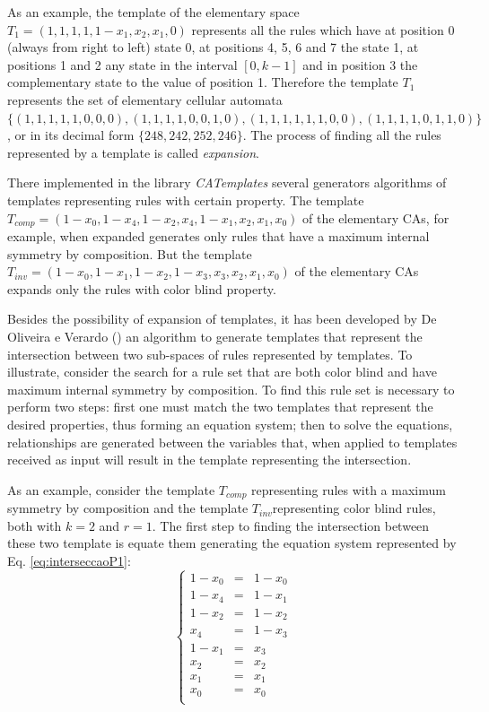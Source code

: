\documentclass[12pt, a4paper]{article}
\begin{document}
As an example, the template of the elementary space $T_1 = (1,1,1,1,1-x_1,x_2,x_1,0)$ represents all the rules which have at position 0 (always from right to left) state 0, at positions 4, 5, 6 and 7 the state 1, at positions 1 and 2 any state in the interval $ [0, k-1] $ and in position 3 the complementary state to the value of position 1. Therefore the template $T_1$ represents the set of elementary cellular automata $\{(1,1,1,1,1,0,0,0),(1,1,1,1,0,0,1,0),(1,1,1,1,1,1,0,0),(1,1,1,1,0,1,1,0)\}$, or in its decimal form $\{248,242,252,246\}$. The process of finding all the rules represented by a template is called \textit{expansion}.

There implemented in the library \textit{CATemplates} \cite{CATemplates} several generators algorithms of templates representing rules with certain property. The template $T_{comp} = (1 - x_0, 1 - x_4, 1 - x_2, x_4, 1 - x_1, x_2, x_1, x_0)$ of the elementary CAs, for example, when expanded generates only rules that have a maximum internal symmetry by composition. But the template $T_{inv} = (1 - x_0, 1 - x_1, 1 - x_2, 1 - x_3, x_3, x_2, x_1, x_0)$ of the elementary CAs expands only the rules with color blind property.

Besides the possibility of expansion of templates, it has been developed by De Oliveira e Verardo (\citeyear{deOliveira2014b}) an algorithm to generate templates that represent the intersection between two sub-spaces of rules represented by templates. To illustrate, consider the search for a rule set that are both color blind and have maximum internal symmetry by composition. To find this rule set is necessary to perform two steps: first one must match the two templates that represent the desired properties, thus forming an equation system; then to solve the equations, relationships are generated between the variables that, when applied to templates received as input will result in the template representing the intersection.

As an example, consider the template $T_{comp}$ representing rules with a maximum symmetry by composition and the template $T_{inv}$representing color blind rules, both with $k=2$ and $r=1$. The first step to finding the intersection between these two template is equate them generating the equation system represented by Eq. \ref{eq:interseccaoP1}:
\begin{equation}
\left\{\begin{matrix}
1 - x_0	& = & 1 - x_0	\\
1 - x_4	& = & 1 - x_1	\\
1 - x_2	& = & 1 - x_2	\\
x_4		& = & 1 - x_3	\\
1 - x_1	& = & x_3		\\
x_2		& = & x_2		\\
x_1		& = & x_1		\\
x_0		& = & x_0		\\
\end{matrix}\right.
\label{eq:interseccaoP1}
\end{equation}
\end{document}
